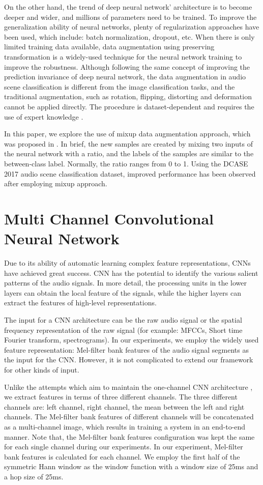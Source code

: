 \documentclass[conference]{IEEEtran}
\begin{document}
On the other hand, the trend of deep neural network' architecture is to become deeper and wider, and millions of parameters need to be trained. To improve the generalization ability of neural networks, plenty of regularization approaches have been used, which include: batch normalization, dropout, etc. When there is only limited training data available, data augmentation using preserving transformation is a widely-used technique for the neural network training to improve the robustness. Although following the same concept of improving the prediction invariance of deep neural network, the data augmentation in audio scene classification is different from the image classification tasks, and the traditional augmentation, such as rotation, flipping, distorting and deformation cannot be applied directly. The procedure is dataset-dependent and requires the use of expert knowledge \cite{b6}.

In this paper, we explore the use of mixup data augmentation approach, which was proposed in \cite{b6}. In brief, the new samples are created by mixing two inputs of the neural network with a ratio, and the labels of the samples are similar to the between-class label. Normally, the ratio ranges from 0 to 1. Using the DCASE 2017 audio scene classification dataset, improved performance has been observed after employing mixup approach. 

\section{Multi Channel Convolutional Neural Network}
Due to its ability of automatic learning complex feature representations, CNNs have achieved great success. CNN has the potential to identify the various salient patterns of the audio signals. In more detail, the processing units in the lower layers can obtain the local feature of the signals, while the higher layers can extract the features of high-level representations.

The input for a CNN architecture can be the raw audio signal or the spatial frequency representation of the raw signal (for example: MFCCs, Short time Fourier transform, spectrograms). In our experiments, we employ the widely used feature representation: Mel-filter bank features of the audio signal segments as the input for the CNN. However, it is not complicated to extend our framework for other kinds of input.

Unlike the attempts which aim to maintain the one-channel CNN architecture \cite{b11}, we extract features in terms of three different channels. The three different channels are: left channel, right channel, the mean between the left and right channels. The Mel-filter bank features of different channels will be concatenated as a multi-channel image, which results in training a system in an end-to-end manner. Note that, the Mel-filter bank features configuration was kept the same for each single channel during our experiments. In our experiment, Mel-filter bank features is calculated for each channel. We employ the first half of the symmetric Hann window as the window function with a window size of 25ms and a hop size of 25ms.
\end{document}
